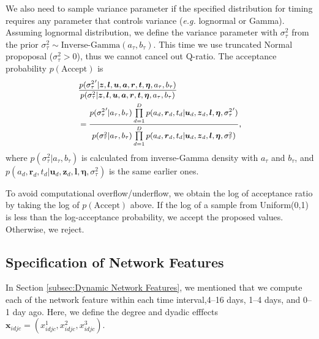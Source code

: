 \documentclass[twoside]{article}
\begin{document}
        We also need to sample variance parameter if the specified distribution for timing requires any parameter that controls variance (\textit{e.g.} lognormal or Gamma). Assuming lognormal distribution, we define the variance parameter with $\sigma_\tau^2$ from the prior $\sigma_\tau^2 \sim \mbox{Inverse-Gamma}(a_\tau, b_\tau)$. This time we use truncated Normal propoposal ($\sigma_\tau^2 > 0$), thus we cannot cancel out Q-ratio. The acceptance probability $p(\mbox{Accept})$ is
        \begin{equation*}
        \footnotesize
        \begin{aligned}
        &\frac{p({\sigma_\tau^2}^\prime|  \boldsymbol{z},\boldsymbol{l}, \boldsymbol{u},\boldsymbol{a}, \boldsymbol{r}, \boldsymbol{t},\boldsymbol{\eta}, a_\tau, b_\tau)}{p(\sigma_\tau^2|\boldsymbol{z},\boldsymbol{l}, \boldsymbol{u},\boldsymbol{a}, \boldsymbol{r}, \boldsymbol{t},\boldsymbol{\eta}, a_\tau, b_\tau)}
        \\& =\frac{p({\sigma_\tau^2}^\prime|a_\tau, b_\tau) \prod\limits_{d=1}^D p({a}_{d}, \boldsymbol{r}_d, t_d| \boldsymbol{u}_d, \boldsymbol{z}_d,  \boldsymbol{l}, \boldsymbol{\eta},{\sigma_\tau^2}^\prime)}{p(\sigma_\tau^2|a_\tau, b_\tau) \prod\limits_{d=1}^Dp({a}_{d}, \boldsymbol{r}_d, t_d| \boldsymbol{u}_d, \boldsymbol{z}_d,  \boldsymbol{l}, \boldsymbol{\eta},{\sigma_\tau^2})},
        \end{aligned}
        \end{equation*}
      where $p(\sigma_\tau^{2}|a_\tau, b_\tau)$ is calculated from inverse-Gamma density with $a_\tau$ and $b_\tau$, and $p({a}_{d}, \boldsymbol{r}_d, t_d| \boldsymbol{u}_d, \boldsymbol{z}_d,  \boldsymbol{l}, \boldsymbol{\eta}, \sigma_\tau^{2})$ is the same earlier ones.
       
    To avoid computational overflow/underflow, we obtain the log of acceptance ratio by taking the log of $p(\mbox{Accept})$ above. If the log of a sample from Uniform(0,1) is less than the log-acceptance probability, we accept the proposed values. Otherwise, we reject.
         
    \subsection{Specification of Network Features}\label{subsec:Specification of Network Features}
    In Section \ref{subsec:Dynamic Network Features}, we mentioned that we compute each of the network feature within each time interval,4--16 days, 1--4 days, and 0--1 day ago. Here, we define the degree and dyadic efffects $\boldsymbol{x}_{idjc} = ({x}^1_{idjc}, {x}^2_{idjc}, {x}^3_{idjc})$.
    
\end{document}
